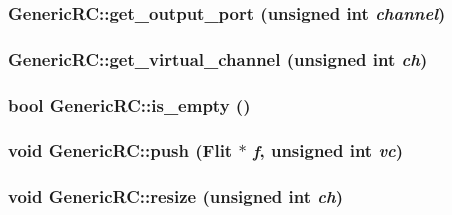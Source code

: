 \hypertarget{classGenericRC_75ca57d2ed84543ef4083c2fe8e83644}{
\subsubsection[{get\_\-output\_\-port}]{ GenericRC::get\_\-output\_\-port (unsigned int {\em channel})}}
\label{classGenericRC_75ca57d2ed84543ef4083c2fe8e83644}


\hypertarget{classGenericRC_c311af5e27b084df2e2463b74e207e3f}{
\subsubsection[{get\_\-virtual\_\-channel}]{ GenericRC::get\_\-virtual\_\-channel (unsigned int {\em ch})}}
\label{classGenericRC_c311af5e27b084df2e2463b74e207e3f}


\hypertarget{classGenericRC_5fc891e7753c5e06cd3599b11bab60a6}{
\subsubsection[{is\_\-empty}]{\setlength{\rightskip}{0pt plus 5cm}bool GenericRC::is\_\-empty ()}}
\label{classGenericRC_5fc891e7753c5e06cd3599b11bab60a6}


\hypertarget{classGenericRC_4698476460f0a811482905dbab564764}{
\subsubsection[{push}]{\setlength{\rightskip}{0pt plus 5cm}void GenericRC::push ({\bf Flit} $\ast$ {\em f}, \/  unsigned int {\em vc})}}
\label{classGenericRC_4698476460f0a811482905dbab564764}


\hypertarget{classGenericRC_611a7de2bb3f1eeea039185f706d0745}{
\subsubsection[{resize}]{\setlength{\rightskip}{0pt plus 5cm}void GenericRC::resize (unsigned int {\em ch})}}
\label{classGenericRC_611a7de2bb3f1eeea039185f706d0745}


